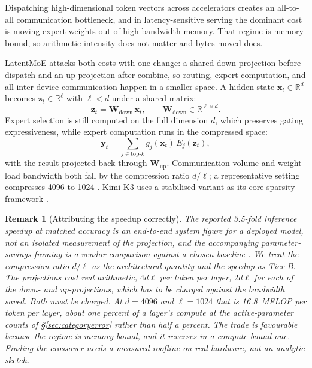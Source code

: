 \documentclass[11pt]{article}
\newtheorem{remark}{Remark}
\begin{document}
Dispatching high-dimensional token vectors across accelerators creates an all-to-all communication bottleneck, and in latency-sensitive serving the dominant cost is moving expert weights out of high-bandwidth memory. That regime is memory-bound, so arithmetic intensity does not matter and bytes moved does.

LatentMoE \cite{nvidia2026latentmoe} attacks both costs with one change: a shared down-projection before dispatch and an up-projection after combine, so routing, expert computation, and all inter-device communication happen in a smaller space. A hidden state $\mathbf{x}_t\in\mathbb{R}^d$ becomes $\mathbf{z}_t\in\mathbb{R}^{\ell}$ with $\ell < d$ under a shared matrix:
\begin{equation}
\mathbf{z}_t = \mathbf{W}_{\mathrm{down}}\,\mathbf{x}_t,
\qquad \mathbf{W}_{\mathrm{down}}\in\mathbb{R}^{\ell\times d}.
\label{eq:latentdown}
\end{equation}
Expert selection is still computed on the full dimension $d$, which preserves gating expressiveness, while expert computation runs in the compressed space:
\begin{equation}
\mathbf{y}_t = \sum_{j\in\text{top-}k} g_j(\mathbf{x}_t)\, E_j(\mathbf{z}_t),
\label{eq:latentroute}
\end{equation}
with the result projected back through $\mathbf{W}_{\mathrm{up}}$. Communication volume and weight-load bandwidth both fall by the compression ratio $d/\ell$; a representative setting compresses 4096 to 1024 \cite{nvidia2026latentmoe}. Kimi K3 uses a stabilised variant as its core sparsity framework \cite{moonshot2026k3}.

\begin{remark}[Attributing the speedup correctly]
The reported 3.5-fold inference speedup at matched accuracy is an end-to-end system figure for a deployed model, not an isolated measurement of the projection, and the accompanying parameter-savings framing is a vendor comparison against a chosen baseline \cite{nvidia2026latentmoe}. We treat the compression ratio $d/\ell$ as the architectural quantity and the speedup as Tier B. The projections cost real arithmetic, $4d\ell$ per token per layer, $2d\ell$ for each of the down- and up-projections, which has to be charged against the bandwidth saved. Both must be charged. At $d = 4096$ and $\ell = 1024$ that is 16.8~MFLOP per token per layer, about one percent of a layer's compute at the active-parameter counts of \S\ref{sec:categoryerror} rather than half a percent. The trade is favourable because the regime is memory-bound, and it reverses in a compute-bound one. Finding the crossover needs a measured roofline on real hardware, not an analytic sketch.
\end{remark}
\end{document}
